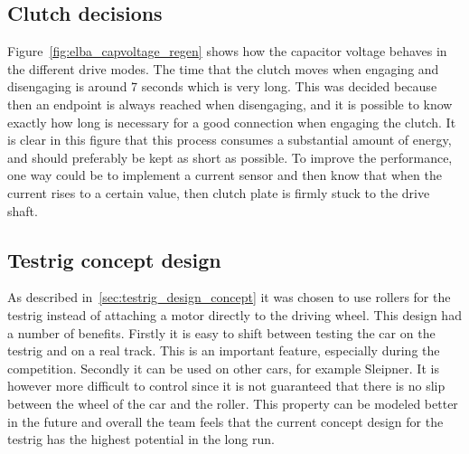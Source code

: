 \subsection{Clutch decisions}
Figure~\ref{fig:elba_capvoltage_regen} shows how the capacitor voltage behaves in the different drive modes.
The time that the clutch moves when engaging and disengaging is around 7 seconds which is very long. This was decided because then an endpoint is always reached when disengaging, and it is possible to know exactly how long is necessary 
for a good connection when engaging the clutch. It is clear in this figure that this process consumes a substantial 
amount of energy, and should preferably be kept as short as possible. To improve the performance, one way could be to implement a current sensor and then know that when the current rises to a certain value, then clutch plate is firmly stuck to the drive shaft.

\subsection{Testrig concept design}\label{sec:discussion_testrig_concept}
As described in~\ref{sec:testrig_design_concept} it was chosen to use rollers for the testrig instead of attaching a motor directly to the driving wheel. This design had a number of benefits. Firstly it is easy to shift between testing the car on the testrig and on a real track. This is an important feature, especially during the competition. Secondly it can be used on other cars, for example Sleipner. It is however more difficult to control since it is not guaranteed that there is no slip between the wheel of the car and the roller. This property can be modeled better in the future and overall the team feels that the current concept design for the testrig has the highest potential in the long run.


